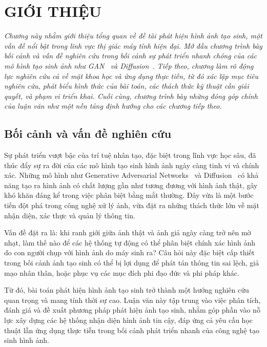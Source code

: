 \chapter{GIỚI THIỆU}
\label{Chapter1}
%
\textit{
Chương này nhằm giới thiệu tổng quan về đề tài phát hiện hình ảnh tạo sinh, một vấn đề nổi bật trong lĩnh vực thị giác máy tính hiện đại. Mở đầu chương trình bày bối cảnh và vấn đề nghiên cứu trong bối cảnh sự phát triển nhanh chóng của các mô hình tạo sinh ảnh như GAN~\cite{Goodfellow2014GenerativeAN} và Diffusion~\cite{Ho2020DenoisingDP}. Tiếp theo, chương làm rõ động lực nghiên cứu cả về mặt khoa học và ứng dụng thực tiễn, từ đó xác lập mục tiêu nghiên cứu, phát biểu hình thức của bài toán, các thách thức kỹ thuật cần giải quyết, và phạm vi triển khai. Cuối cùng, chương trình bày những đóng góp chính của luận văn như một nền tảng định hướng cho các chương tiếp theo.
}\\
%
\section{Bối cảnh và vấn đề nghiên cứu}

Sự phát triển vượt bậc của trí tuệ nhân tạo, đặc biệt trong lĩnh vực học sâu, đã thúc đẩy sự ra đời của các mô hình tạo sinh hình ảnh ngày càng tinh vi và chính xác. Những mô hình như Generative Adversarial Networks~\cite{Goodfellow2014GenerativeAN} và Diffusion~\cite{Ho2020DenoisingDP} có khả năng tạo ra hình ảnh có chất lượng gần như tương đương với hình ảnh thật, gây khó khăn đáng kể trong việc phân biệt bằng mắt thường. Đây vừa là một bước tiến đột phá trong công nghệ xử lý ảnh, vừa đặt ra những thách thức lớn về mặt nhận diện, xác thực và quản lý thông tin.

Vấn đề đặt ra là: khi ranh giới giữa ảnh thật và ảnh giả ngày càng trở nên mờ nhạt, làm thế nào để các hệ thống tự động có thể phân biệt chính xác hình ảnh do con người chụp với hình ảnh do máy sinh ra? Câu hỏi này đặc biệt cấp thiết trong bối cảnh ảnh tạo sinh có thể bị lợi dụng để phát tán thông tin sai lệch, giả mạo nhân thân, hoặc phục vụ các mục đích phi đạo đức và phi pháp khác.

Từ đó, bài toán phát hiện hình ảnh tạo sinh trở thành một hướng nghiên cứu quan trọng và mang tính thời sự cao. Luận văn này tập trung vào việc phân tích, đánh giá và đề xuất phương pháp phát hiện ảnh tạo sinh, nhằm góp phần vào nỗ lực xây dựng các hệ thống nhận diện hình ảnh tin cậy, đáp ứng cả yêu cầu học thuật lẫn ứng dụng thực tiễn trong bối cảnh phát triển nhanh của công nghệ tạo sinh hình ảnh.
%
